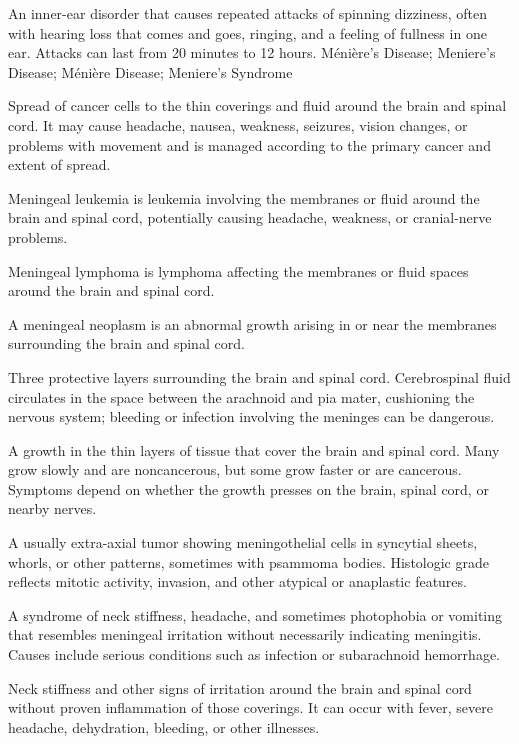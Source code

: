  An inner-ear disorder that causes repeated attacks of spinning dizziness, often with hearing loss that comes and goes, ringing, and a feeling of fullness in one ear. Attacks can last from 20 minutes to 12 hours.
\synonyms
Ménière's Disease; Meniere's Disease; Ménière Disease; Meniere's Syndrome

 Spread of cancer cells to the thin coverings and fluid around the brain and spinal cord. It may cause headache, nausea, weakness, seizures, vision changes, or problems with movement and is managed according to the primary cancer and extent of spread.

 Meningeal leukemia is leukemia involving the membranes or fluid around the brain and spinal cord, potentially causing headache, weakness, or cranial-nerve problems.

 Meningeal lymphoma is lymphoma affecting the membranes or fluid spaces around the brain and spinal cord.

 A meningeal neoplasm is an abnormal growth arising in or near the membranes surrounding the brain and spinal cord.

 Three protective layers surrounding the brain and spinal cord. Cerebrospinal fluid circulates in the space between the arachnoid and pia mater, cushioning the nervous system; bleeding or infection involving the meninges can be dangerous.

 A growth in the thin layers of tissue that cover the brain and spinal cord. Many grow slowly and are noncancerous, but some grow faster or are cancerous. Symptoms depend on whether the growth presses on the brain, spinal cord, or nearby nerves.

 A usually extra-axial tumor showing meningothelial cells in syncytial sheets, whorls, or other patterns, sometimes with psammoma bodies. Histologic grade reflects mitotic activity, invasion, and other atypical or anaplastic features.

 A syndrome of neck stiffness, headache, and sometimes photophobia or vomiting that resembles meningeal irritation without necessarily indicating meningitis. Causes include serious conditions such as infection or subarachnoid hemorrhage.

 Neck stiffness and other signs of irritation around the brain and spinal cord without proven inflammation of those coverings. It can occur with fever, severe headache, dehydration, bleeding, or other illnesses.

